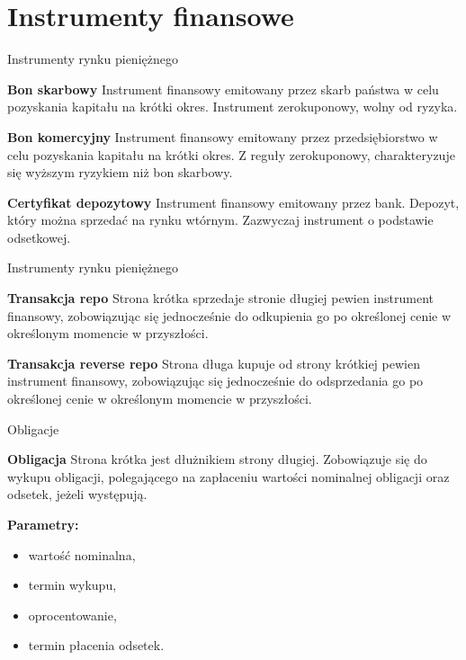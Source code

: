 \documentclass[a4paper, 11pt]{beamer}
\begin{document}
	\section{Instrumenty finansowe}
	
	\begin{frame}{Instrumenty rynku pieniężnego}
		\begin{block}{\textbf{Bon skarbowy}}
			Instrument finansowy emitowany przez skarb państwa w celu pozyskania
			kapitału na krótki okres. Instrument zerokuponowy, wolny od ryzyka.
		\end{block}
		\begin{block}{\textbf{Bon komercyjny}}
			Instrument finansowy emitowany przez przedsiębiorstwo w celu pozyskania
			kapitału na krótki okres. Z reguły zerokuponowy, charakteryzuje się
			wyższym ryzykiem niż bon skarbowy.
		\end{block}
		\begin{block}{\textbf{Certyfikat depozytowy}}
			Instrument finansowy emitowany przez bank. Depozyt, który można sprzedać
			na rynku wtórnym. Zazwyczaj instrument o podstawie odsetkowej.
		\end{block}
	\end{frame}
	
	\begin{frame}{Instrumenty rynku pieniężnego}
		\begin{block}{\textbf{Transakcja repo}}
			Strona krótka sprzedaje stronie długiej pewien instrument finansowy,
			zobowiązując się jednocześnie do odkupienia go po określonej cenie w
			określonym momencie w przyszłości.
		\end{block}
		\begin{block}{\textbf{Transakcja reverse repo}}
			Strona długa kupuje od strony krótkiej pewien instrument finansowy,
			zobowiązując się jednocześnie do odsprzedania go po określonej cenie
			w określonym momencie w przyszłości.
		\end{block}
	\end{frame}
	
	\begin{frame}{Obligacje}
		\begin{block}{\textbf{Obligacja}}
			Strona krótka jest dłużnikiem strony długiej. Zobowiązuje się do
			wykupu obligacji, polegającego na zapłaceniu wartości nominalnej
			obligacji oraz odsetek, jeżeli występują.
		\end{block}
		\textbf{Parametry:}
		\begin{itemize}
			\item wartość nominalna,
			\item termin wykupu,
			\item oprocentowanie,
			\item termin płacenia odsetek.
		\end{itemize}
	\end{frame}
	
\end{document}
